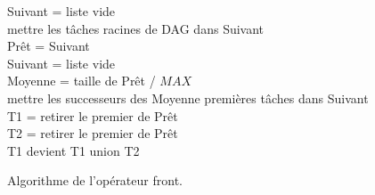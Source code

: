 \begin{algorithm}
  {\sc Suivant} = liste vide \\
  mettre les tâches racines de DAG dans {\sc Suivant} \\
   {
    {\sc Prêt} = {\sc Suivant} \\
    {\sc Suivant} = liste vide \\
    {\sc Moyenne} = taille de {\sc Prêt} / $MAX$ \\

     {
      mettre les successeurs des {\sc Moyenne} premières tâches dans {\sc Suivant} \\
      {\sc T1} = retirer le premier de {\sc Prêt} \\
       {
        {\sc T2} = retirer le premier de {\sc Prêt} \\
        {\sc T1} devient {\sc T1} union {\sc T2}
      }
    }
  }
  \caption{Algorithme de l'opérateur front.}
  \label{algo:algo_F}
\end{algorithm}
